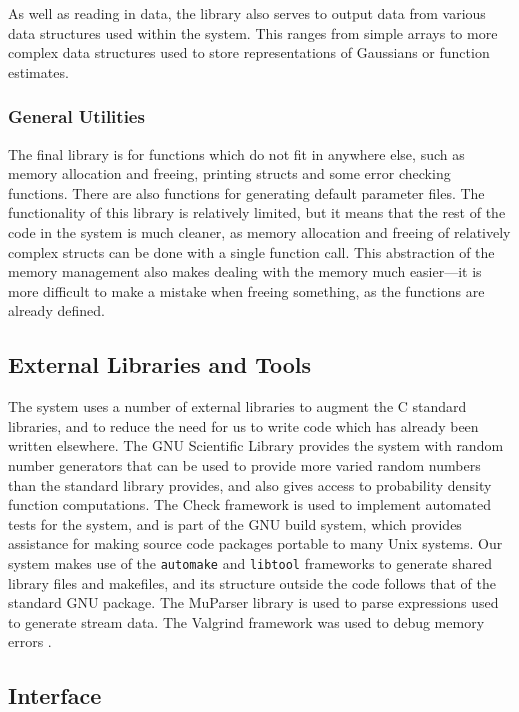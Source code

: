 \documentclass[a4paper,11pt]{article}
\begin{document}
    As well as reading in data, the library also serves to output data from
    various data structures used within the system. This ranges from simple
    arrays to more complex data structures used to store representations of
    Gaussians or function estimates.
\subsubsection{General Utilities}
\label{sec-3-3-4}

    The final library is for functions which do not fit in anywhere else, such
    as memory allocation and freeing, printing structs and some error checking
    functions. There are also functions for generating default parameter
    files. The functionality of this library is relatively limited, but it means
    that the rest of the code in the system is much cleaner, as memory
    allocation and freeing of relatively complex structs can be done with a
    single function call. This abstraction of the memory management also makes
    dealing with the memory much easier---it is more difficult to make a mistake
    when freeing something, as the functions are already defined.
\subsection{External Libraries and Tools}
\label{sec-3-4}

   The system uses a number of external libraries to augment the C standard
   libraries, and to reduce the need for us to write code which has already been
   written elsewhere. The GNU Scientific Library \cite{gsl} provides the system
   with random number generators that can be used to provide more varied random
   numbers than the standard library provides, and also gives access to
   probability density function computations. The Check framework \cite{check}
   is used to implement automated tests for the system, and is part of the GNU
   build system, which provides assistance for making source code packages
   portable to many Unix systems. Our system makes use of the \texttt{automake}
   and \texttt{libtool} frameworks to generate shared library files and
   makefiles, and its structure outside the code follows that of the standard
   GNU package. The MuParser library \cite{muparser} is used to parse
   expressions used to generate stream data. The Valgrind framework was used to
   debug memory errors \cite{valgrind}.
\subsection{Interface}
\label{sec-3-5}
\end{document}
